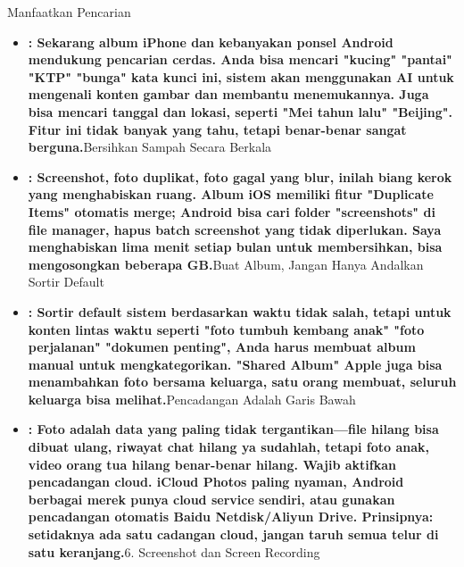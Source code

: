 
Manfaatkan Pencarian

\begin{itemize}
  \item \textbf{: Sekarang album iPhone dan kebanyakan ponsel Android mendukung pencarian cerdas. Anda bisa mencari "kucing" "pantai" "KTP" "bunga" kata kunci ini, sistem akan menggunakan AI untuk mengenali konten gambar dan membantu menemukannya. Juga bisa mencari tanggal dan lokasi, seperti "Mei tahun lalu" "Beijing". Fitur ini tidak banyak yang tahu, tetapi benar-benar sangat berguna.}Bersihkan Sampah Secara Berkala
  \item \textbf{: Screenshot, foto duplikat, foto gagal yang blur, inilah biang kerok yang menghabiskan ruang. Album iOS memiliki fitur "Duplicate Items" otomatis merge; Android bisa cari folder "screenshots" di file manager, hapus batch screenshot yang tidak diperlukan. Saya menghabiskan lima menit setiap bulan untuk membersihkan, bisa mengosongkan beberapa GB.}Buat Album, Jangan Hanya Andalkan Sortir Default
  \item \textbf{: Sortir default sistem berdasarkan waktu tidak salah, tetapi untuk konten lintas waktu seperti "foto tumbuh kembang anak" "foto perjalanan" "dokumen penting", Anda harus membuat album manual untuk mengkategorikan. "Shared Album" Apple juga bisa menambahkan foto bersama keluarga, satu orang membuat, seluruh keluarga bisa melihat.}Pencadangan Adalah Garis Bawah
  \item \textbf{: Foto adalah data yang paling tidak tergantikan—file hilang bisa dibuat ulang, riwayat chat hilang ya sudahlah, tetapi foto anak, video orang tua hilang benar-benar hilang. Wajib aktifkan pencadangan cloud. iCloud Photos paling nyaman, Android berbagai merek punya cloud service sendiri, atau gunakan pencadangan otomatis Baidu Netdisk/Aliyun Drive. Prinsipnya: setidaknya ada satu cadangan cloud, jangan taruh semua telur di satu keranjang.}6. Screenshot dan Screen Recording
\end{itemize}


